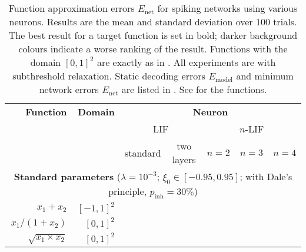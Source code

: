 \begin{table}
\centering\vspace{0.5cm}
\caption[Function approximation errors for spiking networks using various $n$-LIF neurons]{Function approximation errors $E_\mathrm{net}$ for spiking networks using various \nlif neurons.
Results are the mean and standard deviation over $100$ trials.
The best result for a target function is set in bold; darker background colours indicate a worse ranking of the result.
Functions with the domain $[0, 1]^2$ are exactly as in .
All experiments are with subthreshold relaxation.
Static decoding errors $E_\mathrm{model}$ and minimum network errors $E_\mathrm{net}$ are listed in .
See  for the functions.
}
\label{tbl:function_approximations_nlif}
\fontsize{10pt}{12pt}\selectfont
\setlength{\tabcolsep}{10pt}
\renewcommand\arraystretch{1.15}
\sffamily
\begin{tabular}{r r r r r r r }
\toprule
\textbf{Function} & \textbf{Domain} & \multicolumn{5}{c}{\textbf{Neuron}} \\
\cmidrule(r){1-1}\cmidrule(r){2-2}\cmidrule{3-7}
&
&	 \multicolumn{2}{c}{LIF}
&	 \multicolumn{3}{c}{$n$-LIF}
\\
\cmidrule(r){3-4}\cmidrule{5-7}
&
&	 \multicolumn{1}{c}{standard}
&	 \multicolumn{1}{c}{two layers}
&	 \multicolumn{1}{c}{$n = 2$}
&	 \multicolumn{1}{c}{$n = 3$}
&	 \multicolumn{1}{c}{$n = 4$}
\\
\midrule
\multicolumn{7}{c}{\textbf{Standard parameters} ($\lambda = 10^{-3}$; $\xi_0 \in [-0.95, 0.95]$; with Dale's principle, $p_\mathrm{inh} = 30\%$)} \\
\midrule
$x_1 + x_2$
& $[-1, 1]^2$
& \cellcolor{White!80!SteelBlue}{$4.1 \pm 0.2 \%$}
& \cellcolor{White!20!SteelBlue}{$9.3 \pm 0.5 \%$}
& \cellcolor{White!100!SteelBlue}{$\mathbf{3.6 \pm 0.2 \%}$}
& \cellcolor{White!60!SteelBlue}{$5.4 \pm 0.6 \%$}
& \cellcolor{White!40!SteelBlue}{$7.3 \pm 1.2 \%$}
\\
$x_1 / (1 + x_2)$
& $[0, 1]^2$
& \cellcolor{White!60!SteelBlue}{$9.0 \pm 0.7 \%$}
& \cellcolor{White!40!SteelBlue}{$9.6 \pm 0.8 \%$}
& \cellcolor{White!100!SteelBlue}{$\mathbf{4.6 \pm 0.5 \%}$}
& \cellcolor{White!80!SteelBlue}{$8.0 \pm 1.9 \%$}
& \cellcolor{White!20!SteelBlue}{$10.4 \pm 2.7 \%$}
\\
$\sqrt{x_1 \times x_2}$
& $[0, 1]^2$
& \cellcolor{White!20!SteelBlue}{$14.7 \pm 1.4 \%$}
& \cellcolor{White!40!SteelBlue}{$12.0 \pm 1.0 \%$}

\end{tabular}
\end{table}
